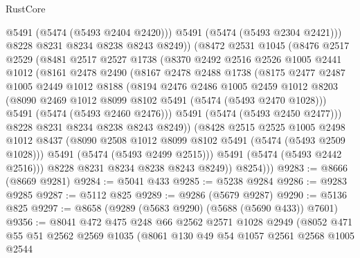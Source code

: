 \begin{lexlean}{RustCore}
\begin{coremodule}
                @5491
                (@5474 (@5493 @2404 @2420)))
              @5491
              (@5474 (@5493 @2304 @2421)))
            @8228
            @8231
            @8234
            @8238
            @8243
            @8249))
        (@8472
          @2531
          @1045
          (@8476
            @2517
            @2529
            (@8481
              @2517
              @2527
              @1738
              (@8370
                @2492
                @2516
                @2526
                @1005
                @2441
                @1012
                (@8161
                  @2478
                  @2490
                  (@8167
                    @2478
                    @2488
                    @1738
                    (@8175
                      @2477
                      @2487
                      @1005
                      @2449
                      @1012
                      @8188
                      (@8194
                        @2476
                        @2486
                        @1005
                        @2459
                        @1012
                        @8203
                        (@8090 @2469 @1012 @8099 @8102 @5491 (@5474 (@5493 @2470 @1028)))
                        @5491
                        (@5474 (@5493 @2460 @2476)))
                      @5491
                      (@5474 (@5493 @2450 @2477)))
                    @8228
                    @8231
                    @8234
                    @8238
                    @8243
                    @8249))
                (@8428
                  @2515
                  @2525
                  @1005
                  @2498
                  @1012
                  @8437
                  (@8090 @2508 @1012 @8099 @8102 @5491 (@5474 (@5493 @2509 @1028)))
                  @5491
                  (@5474 (@5493 @2499 @2515)))
                @5491
                (@5474 (@5493 @2442 @2516)))
              @8228
              @8231
              @8234
              @8238
              @8243
              @8249))
          @8254)))
@9283 := @8666 (@8669 @9281)
@9284 := @5041 @433
@9285 := @5238 @9284
@9286 := @9283 @9285
@9287 := @5112 @825
@9289 := @9286 (@5679 @9287)
@9290 := @5136 @825
@9297 := @8658 (@9289 (@5683 @9290) (@5688 (@5690 @433)) @7601)
@9356 := @8041
    @472
    @475
    @248
    @66
    @2562
    @2571
    @1028
    @2949
    (@8052
      @471
      @55
      @51
      @2562
      @2569
      @1035
      (@8061
        @130
        @49
        @54
        @1057
        @2561
        @2568
        @1005
        @2544

\end{coremodule}
\end{lexlean}
